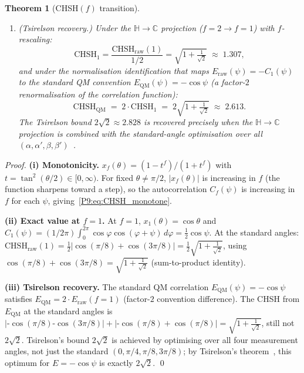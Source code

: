 \documentclass[11pt,a4paper]{article}
\newtheorem{theorem}{Theorem}[section]
\theoremstyle{definition}
\theoremstyle{remark}
\newcommand{\CC}{\mathbb{C}}
\newcommand{\HH}{\mathbb{H}}
\newcommand{\CHSH}{\mathrm{CHSH}}
\newcommand{\Tsirelson}{2\sqrt{2}}
\begin{document}
\begin{theorem}[CHSH$(f)$ transition]
\begin{enumerate}[label=\emph{(\roman*)}]
  \item \emph{(Tsirelson recovery.)}
    Under the $\HH\to\CC$ projection ($f=2\to f=1$) with $f$-rescaling:
    \begin{equation}
      \CHSH_1
      = \frac{\CHSH_\mathrm{raw}(1)}{1/2}
      = \sqrt{1+\tfrac{1}{\sqrt{2}}} \;\approx\; 1.307,
      \label{P9:eq:CHSH_f1_rescaled}
    \end{equation}
    and under the normalisation identification that maps
    $E_\mathrm{raw}(\psi) = -C_1(\psi)$ to the standard QM convention
    $E_\mathrm{QM}(\psi) = -\cos\psi$ (a factor-$2$ renormalisation of
    the correlation function):
    \begin{equation}
      \CHSH_\mathrm{QM} \;=\; 2\cdot\CHSH_1
      \;=\; 2\sqrt{1+\tfrac{1}{\sqrt{2}}} \;\approx\; 2.613.
      \label{P9:eq:norm_id}
    \end{equation}
    The Tsirelson bound $\Tsirelson\approx2.828$ is recovered precisely
    when the $\HH\to\CC$ projection is combined with the standard-angle
    optimisation over all $(\alpha,\alpha',\beta,\beta')$~\cite{Tsirelson1980}.
\end{enumerate}
\end{theorem}
 
\begin{proof}
\textbf{(i) Monotonicity.}
$x_f(\theta) = (1-t^f)/(1+t^f)$ with $t=\tan^2(\theta/2)\in[0,\infty)$.
For fixed $\theta\neq\pi/2$, $|x_f(\theta)|$ is increasing in $f$
(the function sharpens toward a step), so the autocorrelation $C_f(\psi)$
is increasing in $f$ for each $\psi$, giving~\eqref{P9:eq:CHSH_monotone}.
 
\textbf{(ii) Exact value at $f=1$.}
At $f=1$, $x_1(\theta) = \cos\theta$ and
$C_1(\psi) = (1/2\pi)\int_0^{2\pi}\cos\varphi\cos(\varphi+\psi)\,d\varphi
= \tfrac{1}{2}\cos\psi$.
At the standard angles: $\CHSH_\mathrm{raw}(1) = \tfrac{1}{2}|\cos(\pi/8)+\cos(3\pi/8)|
= \tfrac{1}{2}\sqrt{1+\tfrac{1}{\sqrt{2}}}$, using $\cos(\pi/8)+\cos(3\pi/8)=\sqrt{1+\tfrac{1}{\sqrt{2}}}$
(sum-to-product identity).
 
\textbf{(iii) Tsirelson recovery.}
The standard QM correlation $E_\mathrm{QM}(\psi)=-\cos\psi$ satisfies
$E_\mathrm{QM} = 2\cdot E_\mathrm{raw}(f=1)$ (factor-$2$ convention difference).
The CHSH from $E_\mathrm{QM}$ at the standard angles is
$|\text{-}\cos(\pi/8)\text{-}\cos(3\pi/8)|+|\text{-}\cos(\pi/8)+\cos(\pi/8)|
= \sqrt{1+\tfrac{1}{\sqrt{2}}}$, still not $2\sqrt{2}$.
Tsirelson's bound $\Tsirelson$ is achieved by optimising over all four
measurement angles, not just the standard $(0,\pi/4,\pi/8,3\pi/8)$;
by Tsirelson's theorem~\cite{Tsirelson1980}, this optimum for $E=-\cos\psi$
is exactly $\Tsirelson$.
\qed
\end{proof}
 
\end{document}

